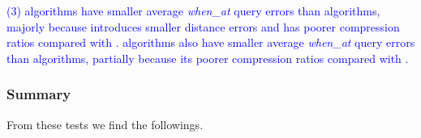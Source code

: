 {\ni \textcolor{blue}{(3) \sed algorithms have smaller average \emph{when\_at} query errors than \ped algorithms, majorly because \sed introduces smaller distance errors and has poorer compression ratios compared with \ped. \dad algorithms also have smaller average \emph{when\_at} query errors than \ped algorithms, partially because its poorer compression ratios compared with \ped. }
	

\subsubsection{Summary}
\label{sec-exp-summary}
From these tests we find the followings.

}
